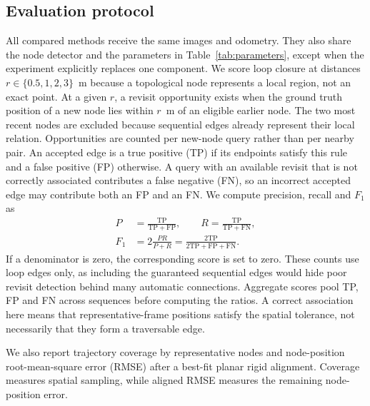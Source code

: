 \documentclass[5p,twocolumn,nonatbib,reversenotenum]{elsarticle}
\begin{document}
\subsection{Evaluation protocol}
All compared methods receive the same images and odometry. They also share the node detector and the parameters in Table~\ref{tab:parameters}, except when the experiment explicitly replaces one component. We score loop closure at distances $r\in\{0.5,1,2,3\}$~m because a topological node represents a local region, not an exact point. At a given $r$, a revisit opportunity exists when the ground truth position of a new node lies within $r$~m of an eligible earlier node. The two most recent nodes are excluded because sequential edges already represent their local relation. Opportunities are counted per new-node query rather than per nearby pair. An accepted edge is a true positive (TP) if its endpoints satisfy this rule and a false positive (FP) otherwise. A query with an available revisit that is not correctly associated contributes a false negative (FN), so an incorrect accepted edge may contribute both an FP and an FN. We compute precision, recall and $F_1$ as
\begin{equation}
\begin{aligned}
    P &= \frac{\mathrm{TP}}{\mathrm{TP}+\mathrm{FP}}, \qquad
    R = \frac{\mathrm{TP}}{\mathrm{TP}+\mathrm{FN}}, \\
    F_1 &= 2\frac{PR}{P+R}
           = \frac{2\mathrm{TP}}{2\mathrm{TP}+\mathrm{FP}+\mathrm{FN}}.
\end{aligned}
\end{equation}
If a denominator is zero, the corresponding score is set to zero. These counts use loop edges only, as including the guaranteed sequential edges would hide poor revisit detection behind many automatic connections. Aggregate scores pool TP, FP and FN across sequences before computing the ratios. A correct association here means that representative-frame positions satisfy the spatial tolerance, not necessarily that they form a traversable edge.

We also report trajectory coverage by representative nodes and node-position root-mean-square error (RMSE) after a best-fit planar rigid alignment. Coverage measures spatial sampling, while aligned RMSE measures the remaining node-position error.
\end{document}
